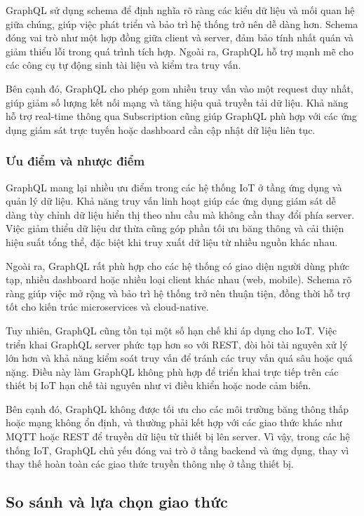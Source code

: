 GraphQL sử dụng schema để định nghĩa rõ ràng các kiểu dữ liệu và mối quan hệ giữa
chúng, giúp việc phát triển và bảo trì hệ thống trở nên dễ dàng hơn. Schema đóng
vai trò như một hợp đồng giữa client và server, đảm bảo tính nhất quán và giảm
thiểu lỗi trong quá trình tích hợp. Ngoài ra, GraphQL hỗ trợ mạnh mẽ cho các công
cụ tự động sinh tài liệu và kiểm tra truy vấn.

Bên cạnh đó, GraphQL cho phép gom nhiều truy vấn vào một request duy nhất, giúp
giảm số lượng kết nối mạng và tăng hiệu quả truyền tải dữ liệu. Khả năng hỗ trợ
real-time thông qua Subscription cũng giúp GraphQL phù hợp với các ứng dụng giám
sát trực tuyến hoặc dashboard cần cập nhật dữ liệu liên tục.

\subsubsection{Ưu điểm và nhược điểm}
GraphQL mang lại nhiều ưu điểm trong các hệ thống IoT ở tầng ứng dụng và quản lý
dữ liệu. Khả năng truy vấn linh hoạt giúp các ứng dụng giám sát dễ dàng tùy chỉnh
dữ liệu hiển thị theo nhu cầu mà không cần thay đổi phía server. Việc giảm thiểu
dữ liệu dư thừa cũng góp phần tối ưu băng thông và cải thiện hiệu suất tổng thể,
đặc biệt khi truy xuất dữ liệu từ nhiều nguồn khác nhau.

Ngoài ra, GraphQL rất phù hợp cho các hệ thống có giao diện người dùng phức tạp,
nhiều dashboard hoặc nhiều loại client khác nhau (web, mobile). Schema rõ ràng
giúp việc mở rộng và bảo trì hệ thống trở nên thuận tiện, đồng thời hỗ trợ tốt
cho kiến trúc microservices và cloud-native.

Tuy nhiên, GraphQL cũng tồn tại một số hạn chế khi áp dụng cho IoT. Việc triển khai
GraphQL server phức tạp hơn so với REST, đòi hỏi tài nguyên xử lý lớn hơn và khả
năng kiểm soát truy vấn để tránh các truy vấn quá sâu hoặc quá nặng. Điều này làm
GraphQL không phù hợp để triển khai trực tiếp trên các thiết bị IoT hạn chế tài
nguyên như vi điều khiển hoặc node cảm biến.

Bên cạnh đó, GraphQL không được tối ưu cho các môi trường băng thông thấp hoặc
mạng không ổn định, và thường phải kết hợp với các giao thức khác như MQTT hoặc
REST để truyền dữ liệu từ thiết bị lên server. Vì vậy, trong các hệ thống IoT,
GraphQL chủ yếu đóng vai trò ở tầng backend và ứng dụng, thay vì thay thế hoàn
toàn các giao thức truyền thông nhẹ ở tầng thiết bị.

\subsection{So sánh và lựa chọn giao thức}

